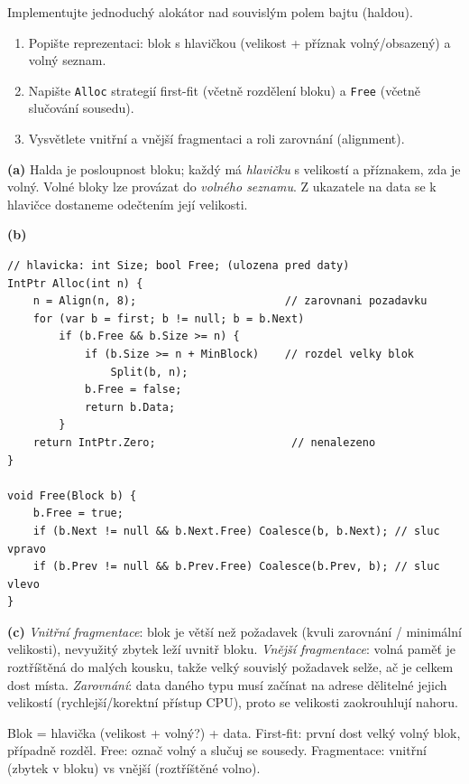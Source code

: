 \begin{zadani}
Implementujte jednoduchý alokátor nad souvislým polem bajtu (haldou).
\begin{enumerate}[label=(\alph*)]
  \item {} Popište reprezentaci: blok s hlavičkou (velikost + příznak volný/obsazený) a volný seznam.
  \item {} Napište \texttt{Alloc} strategií first-fit (včetně rozdělení bloku) a \texttt{Free} (včetně slučování sousedu).
  \item {} Vysvětlete vnitřní a vnější fragmentaci a roli zarovnání (alignment).
\end{enumerate}
\end{zadani}

\begin{reseni}
\textbf{(a)} Halda je posloupnost bloku; každý má \emph{hlavičku} s velikostí a příznakem, zda je volný. Volné bloky lze provázat do \emph{volného seznamu}. Z ukazatele na data se k hlavičce dostaneme odečtením její velikosti.

\textbf{(b)}
\begin{lstlisting}
// hlavicka: int Size; bool Free; (ulozena pred daty)
IntPtr Alloc(int n) {
    n = Align(n, 8);                       // zarovnani pozadavku
    for (var b = first; b != null; b = b.Next)
        if (b.Free && b.Size >= n) {
            if (b.Size >= n + MinBlock)    // rozdel velky blok
                Split(b, n);
            b.Free = false;
            return b.Data;
        }
    return IntPtr.Zero;                     // nenalezeno
}

void Free(Block b) {
    b.Free = true;
    if (b.Next != null && b.Next.Free) Coalesce(b, b.Next); // sluc vpravo
    if (b.Prev != null && b.Prev.Free) Coalesce(b.Prev, b); // sluc vlevo
}
\end{lstlisting}

\textbf{(c)} \emph{Vnitřní fragmentace}: blok je větší než požadavek (kvuli zarovnání / minimální velikosti), nevyužitý zbytek leží uvnitř bloku. \emph{Vnější fragmentace}: volná paměť je roztříštěná do malých kousku, takže velký souvislý požadavek selže, ač je celkem dost místa. \emph{Zarovnání}: data daného typu musí začínat na adrese dělitelné jejich velikostí (rychlejší/korektní přístup CPU), proto se velikosti zaokrouhlují nahoru.
\end{reseni}

\begin{jadro}
Blok = hlavička (velikost + volný?) + data. First-fit: první dost velký volný blok, případně rozděl. Free: označ volný a slučuj se sousedy. Fragmentace: vnitřní (zbytek v bloku) vs vnější (roztříštěné volno).
\end{jadro}

